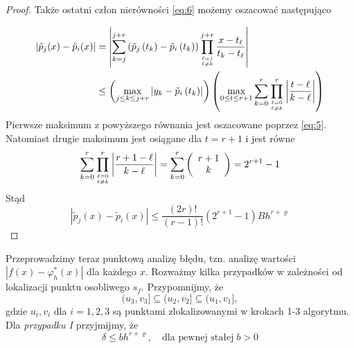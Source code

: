 \documentclass[oik, pdftex, robocza, man]{mgrwms}
\begin{document}
\begin{proof}
        Także ostatni człon nierówności \eqref{eq:6} możemy oszacować następująco

        \begin{equation*}
            \begin{aligned}
                \left|\tilde{p}_{j}(x)-\tilde{p}_{i}(x)\right| &=\left|\sum_{k=j}^{j+r}\left(\tilde{p}_{j}\left(t_{k}\right)-\tilde{p}_{i}\left(t_{k}\right)\right) \prod_{\ell=j \atop \ell \neq k}^{j+r} \frac{x-t_{\ell}}{t_{k}-t_{\ell}}\right| \\
                & \leq\left(\max _{j \leq k \leq j+r}\left|y_{k}-\tilde{p}_{i}\left(t_{k}\right)\right|\right)\left(\max _{0 \leq t \leq r+1} \sum_{k=0}^{r} \prod_{\ell=0 \atop \ell \neq k}^{r}\left|\frac{t-\ell}{k-\ell}\right|\right)
            \end{aligned}                
        \end{equation*}
        Pierwsze maksimum z powyższego równania jest oszacowane poprzez \eqref{eq:5}. Natomiast drugie maksimum jest osiągane dla $t=r+1$ i jest równe
        \begin{equation*}
            \sum_{k=0}^{r} \prod_{\ell=0 \atop \ell \neq k}^{r}\left|\frac{r+1-\ell}{k-\ell}\right|=\sum_{k=0}^{r}\left(\begin{array}{c} r+1 \\ k\end{array}\right)=2^{r+1}-1
        \end{equation*}
        Stąd
        \begin{equation*}
            \left|\tilde{p}_{j}(x)-\tilde{p}_{i}(x)\right| \leq \frac{(2 r) !}{(r-1) !}\left(2^{r+1}-1\right) B h^{r+\varrho}
        \end{equation*}
    \end{proof}

    Przeprowadzimy teraz punktową analizę błędu, tzn. analizę wartości $|f(x) - \varphi_{h}^{*}(x)|$ dla każdego $x$. Rozważmy kilka przypadków w zależności od lokalizacji punktu osobliwego $s_{f}$. Przypomnijmy, że
    \begin{equation*}
        (u_{3}, v_{3}] \subseteq (u_{2}, v_{2}] \subseteq (u_{1}, v_{1}],
    \end{equation*}
    gdzie $u_{i}, v_{i}$ dla $i=1,2,3$ są punktami zlokalizowanymi w krokach 1-3 algorytmu. Dla \textit{przypadku I} przyjmijmy, że
    \begin{equation} \label{eq:algMP_7}
        \delta \leq bh^{r+\varrho}, \quad \text{dla pewnej stałej}\; b>0
    \end{equation}
\end{document}

